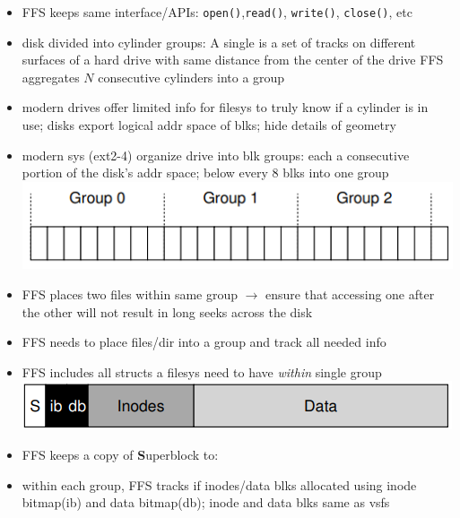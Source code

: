 \begin{itemize}
\item FFS keeps same interface/APIs: \texttt{open()},\texttt{read()}, \texttt{write()}, \texttt{close()}, etc
\item disk divided into cylinder groups: A single  is a set of tracks on different surfaces of a hard drive with same distance from the center of the drive FFS aggregates $N$ consecutive cylinders into a group
\item modern drives offer limited info for filesys to truly know if a cylinder is in use; disks export logical addr space of blks; hide details of geometry
\item modern sys (ext2-4) organize drive into blk groups: each a consecutive portion of the disk’s addr space; below every 8 blks into one group
  \includegraphics[width=\linewidth]{imgs/ffs_disk_groups}
\item FFS places two files within same group $\to$ ensure that accessing one after the other will not result in long seeks across the disk
\item FFS needs to place files/dir into a group and track all needed info
\item FFS includes all structs a filesys need to have \emph{within} single group
  \includegraphics[width=\linewidth]{imgs/ffs_sgroup}
\item FFS keeps a copy of \textbf{S}uperblock to:
\item within each group, FFS tracks if inodes/data blks allocated using inode bitmap(ib) and data bitmap(db); inode and data blks same as vsfs
\end{itemize}
